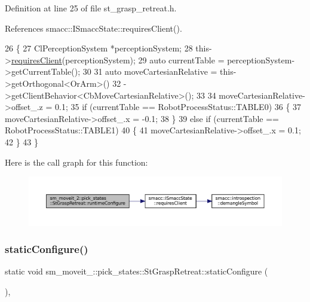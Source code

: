 Definition at line 25 of file st\+\_\+grasp\+\_\+retreat.\+h.



References smacc\+::\+I\+Smacc\+State\+::requires\+Client().


\begin{DoxyCode}
26     \{
27         ClPerceptionSystem *perceptionSystem;
28         this->\hyperlink{classsmacc_1_1ISmaccState_a7f95c9f0a6ea2d6f18d1aec0519de4ac}{requiresClient}(perceptionSystem);
29         \textcolor{keyword}{auto} currentTable = perceptionSystem->getCurrentTable();
30 
31         \textcolor{keyword}{auto} moveCartesianRelative = this->getOrthogonal<OrArm>()
32                                          ->getClientBehavior<CbMoveCartesianRelative>();
33 
34         moveCartesianRelative->offset\_.z = 0.1;
35         \textcolor{keywordflow}{if} (currentTable == RobotProcessStatus::TABLE0)
36         \{
37             moveCartesianRelative->offset\_.x = -0.1;
38         \}
39         \textcolor{keywordflow}{else} \textcolor{keywordflow}{if} (currentTable == RobotProcessStatus::TABLE1)
40         \{
41             moveCartesianRelative->offset\_.x = 0.1;
42         \}
43     \}
\end{DoxyCode}
Here is the call graph for this function\+:
\nopagebreak
\begin{figure}[H]
\begin{center}
\leavevmode
\includegraphics[width=350pt]{structsm__moveit__2_1_1pick__states_1_1StGraspRetreat_a5f454ef073692f393c0659ba61442c17_cgraph}
\end{center}
\end{figure}
\mbox{\label{structsm__moveit__2_1_1pick__states_1_1StGraspRetreat_af2fc65da859d23f96639baf8604c88b4}} 
\subsubsection{\texorpdfstring{static\+Configure()}{staticConfigure()}}
{\footnotesize\ttfamily static void sm\+\_\+moveit\+\_\+::pick\+\_\+states\+::\+St\+Grasp\+Retreat\+::static\+Configure (\begin{DoxyParamCaption}{ }\end{DoxyParamCaption})\hspace{0.3cm}{\ttfamily [inline]}, {\ttfamily [static]}}



